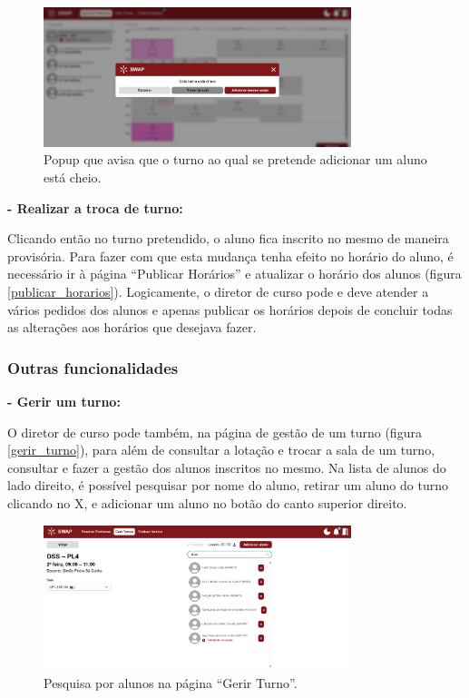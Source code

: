 \documentclass[12pt, a4paper]{article}
\begin{document}
\begin{figure}[H]
    \centering
    \includegraphics[width=0.8\textwidth]{res/manual/popup_turno_cheio.png}
    \caption{Popup que avisa que o turno ao qual se pretende adicionar um aluno está cheio.}
    \label{popup_turno_cheio}
\end{figure}

\textbf{- Realizar a troca de turno:}

Clicando então no turno pretendido, o aluno fica inscrito no mesmo de maneira provisória. Para fazer
com que esta mudança tenha efeito no horário do aluno, é necessário ir à página
``Publicar Horários'' e atualizar o horário dos alunos (figura \ref{publicar_horarios}).
Logicamente, o diretor de curso pode e deve atender a vários pedidos dos alunos e apenas publicar os
horários depois de concluir todas as alterações aos horários que desejava fazer.

\subsubsection{Outras funcionalidades}

\textbf{- Gerir um turno:}

O diretor de curso pode também, na página de gestão de um turno (figura \ref{gerir_turno}),
para além de consultar a lotação e trocar a sala de um turno, consultar e fazer a gestão dos
alunos inscritos no mesmo. Na lista de alunos do lado direito, é possível pesquisar por nome do
aluno, retirar um aluno do turno clicando no X, e adicionar um aluno no botão do canto superior
direito.

\begin{figure}[H]
    \centering
    \includegraphics[width=0.8\textwidth]{res/manual/gerir_turno_pesquisar_alunos.png}
    \caption{Pesquisa por alunos na página ``Gerir Turno''.}
    \label{gerir_turno_pesquisar}
\end{figure}
\end{document}
